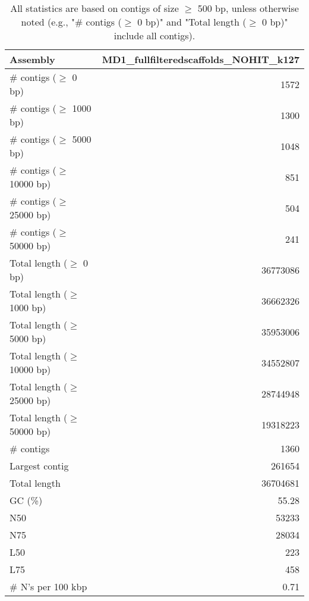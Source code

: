 \documentclass[12pt,a4paper]{article}
\begin{document}
\begin{table}[ht]
\begin{center}
\caption{All statistics are based on contigs of size $\geq$ 500 bp, unless otherwise noted (e.g., "\# contigs ($\geq$ 0 bp)" and "Total length ($\geq$ 0 bp)" include all contigs).}
\begin{tabular}{|l*{1}{|r}|}
\hline
Assembly & MD1\_fullfilteredscaffolds\_NOHIT\_k127 \\ \hline
\# contigs ($\geq$ 0 bp) & 1572 \\ \hline
\# contigs ($\geq$ 1000 bp) & 1300 \\ \hline
\# contigs ($\geq$ 5000 bp) & 1048 \\ \hline
\# contigs ($\geq$ 10000 bp) & 851 \\ \hline
\# contigs ($\geq$ 25000 bp) & 504 \\ \hline
\# contigs ($\geq$ 50000 bp) & 241 \\ \hline
Total length ($\geq$ 0 bp) & 36773086 \\ \hline
Total length ($\geq$ 1000 bp) & 36662326 \\ \hline
Total length ($\geq$ 5000 bp) & 35953006 \\ \hline
Total length ($\geq$ 10000 bp) & 34552807 \\ \hline
Total length ($\geq$ 25000 bp) & 28744948 \\ \hline
Total length ($\geq$ 50000 bp) & 19318223 \\ \hline
\# contigs & 1360 \\ \hline
Largest contig & 261654 \\ \hline
Total length & 36704681 \\ \hline
GC (\%) & 55.28 \\ \hline
N50 & 53233 \\ \hline
N75 & 28034 \\ \hline
L50 & 223 \\ \hline
L75 & 458 \\ \hline
\# N's per 100 kbp & 0.71 \\ \hline
\end{tabular}
\end{center}
\end{table}
\end{document}
